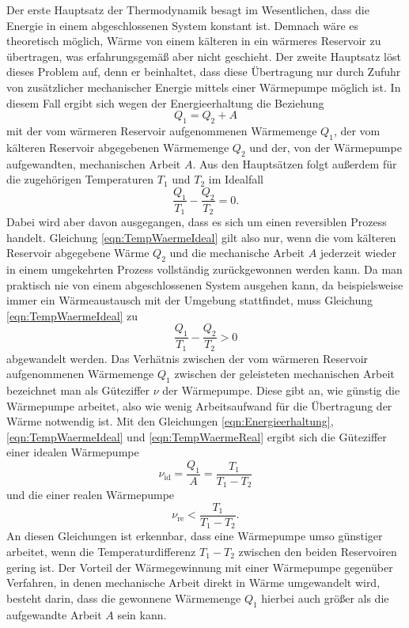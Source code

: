 Der erste Hauptsatz der Thermodynamik
besagt im Wesentlichen, dass die Energie in einem
abgeschlossenen System konstant ist. Demnach wäre es theoretisch möglich,
Wärme von einem kälteren in ein wärmeres Reservoir zu übertragen, was
erfahrungsgemäß aber nicht geschieht.
Der zweite Hauptsatz löst dieses Problem auf, denn er beinhaltet, dass diese
Übertragung nur durch Zufuhr von zusätzlicher mechanischer Energie
mittels einer Wärmepumpe möglich ist. In diesem Fall ergibt sich wegen der
Energieerhaltung die Beziehung
\begin{equation}
  Q_1 = Q_2 + A
  \label{eqn:Energieerhaltung}
\end{equation}
mit der vom wärmeren Reservoir aufgenommenen Wärmemenge $Q_1$, der vom kälteren
Reservoir abgegebenen Wärmemenge $Q_2$ und der, von der Wärmepumpe aufgewandten,
mechanischen Arbeit $A$.
Aus den Hauptsätzen folgt außerdem für die zugehörigen Temperaturen $T_1$ und
$T_2$ im Idealfall
\begin{equation}
  \frac{Q_1}{T_1} - \frac{Q_2}{T_2} = 0.
  \label{eqn:TempWaermeIdeal}
\end{equation}
Dabei wird aber davon ausgegangen, dass es sich um einen reversiblen Prozess
handelt. Gleichung \eqref{eqn:TempWaermeIdeal} gilt also nur, wenn die vom
kälteren Reservoir abgegebene Wärme $Q_2$ und die mechanische Arbeit $A$
jederzeit wieder in einem umgekehrten Prozess vollständig zurückgewonnen werden
kann. Da man praktisch nie von einem abgeschlossenen System ausgehen kann, da
beispielsweise immer ein Wärmeaustausch mit der Umgebung stattfindet, muss
Gleichung \eqref{eqn:TempWaermeIdeal} zu
\begin{equation}
  \frac{Q_1}{T_1} - \frac{Q_2}{T_2} > 0
  \label{eqn:TempWaermeReal}
\end{equation}
abgewandelt werden.
Das Verhätnis zwischen der vom wärmeren Reservoir aufgenommenen Wärmemenge $Q_1$
zwischen der geleisteten mechanischen Arbeit bezeichnet man als Güteziffer $\nu$
der Wärmepumpe. Diese gibt an, wie günstig die Wärmepumpe arbeitet, also wie
wenig Arbeitsaufwand für die Übertragung der Wärme notwendig ist.
Mit den Gleichungen \eqref{eqn:Energieerhaltung}, \eqref{eqn:TempWaermeIdeal}
und \eqref{eqn:TempWaermeReal} ergibt sich die Güteziffer einer idealen
Wärmepumpe
\begin{equation}
  \nu_\text{id} = \frac{Q_1}{A} = \frac{T_1}{T_1-T_2}
  \label{eqn:nuid}
\end{equation}
und die einer realen Wärmepumpe
\begin{equation}
  \nu_\text{re} < \frac{T_1}{T_1-T_2}.
\end{equation}
An diesen Gleichungen ist erkennbar, dass eine Wärmepumpe umso günstiger
arbeitet, wenn die Temperaturdifferenz $T_1-T_2$ zwischen den beiden Reservoiren
gering ist.
Der Vorteil der Wärmegewinnung mit einer Wärmepumpe gegenüber Verfahren, in
denen mechanische Arbeit direkt in Wärme umgewandelt wird, besteht darin, dass
die gewonnene Wärmemenge $Q_1$ hierbei auch größer als die aufgewandte Arbeit
$A$ sein kann.

